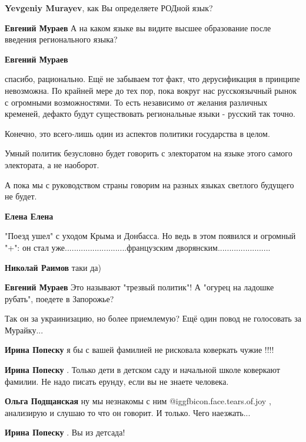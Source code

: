 \begin{itemize}
\begin{itemize}
\textbf{Yevgeniy Murayev}, как Вы определяете РОДной язык?

\textbf{Евгений Мураев}
А на каком языке вы видите высшее образование после введения регионального языка?

\textbf{Евгений Мураев} 

спасибо, рационально. Ещё не забываем тот факт, что дерусификация в принципе
невозможна. По крайней мере до тех пор, пока вокруг нас русскоязычный рынок с
огромными возможностями. То есть независимо от желания различных кременей,
дефакто будут существовать региональные языки - русский так точно.

Конечно, это всего-лишь один из аспектов политики государства в целом.

Умный политик безусловно будет говорить с электоратом на языке этого самого
электората, а не наоборот.

А пока мы с руководством страны говорим на разных языках светлого будущего не
будет.


\textbf{Елена Елена} 

"Поезд ушел" с уходом Крыма и Донбасса. Но ведь в этом появился и огромный "+":
он стал уже...........................французским
дворянским.......................

\textbf{Николай Раимов} таки да)

\textbf{Евгений Мураев} Это называют "трезвый политик"! А "огурец на ладошке рубать", поедете в Запорожье?

\end{itemize} %


Так он за украинизацию, но более приемлемую? Ещё один повод не голосовать за
Мурайку...

\begin{itemize} %
\textbf{Ирина Попеску} я бы с вашей фамилией не рисковала коверкать чужие !!!!

\textbf{Ирина Попеску} . Только дети в детском саду и начальной школе коверкают фамилии. Не надо писать ерунду, если вы не знаете человека.

\textbf{Ольга Подщанская} ну мы незнакомы с ним @igg{fbicon.face.tears.of.joy} , анализирую и слушаю то что он говорит. И только. Чего наезжать...

\textbf{Ирина Попеску} . Вы из детсада!


\end{itemize}
\end{itemize}
